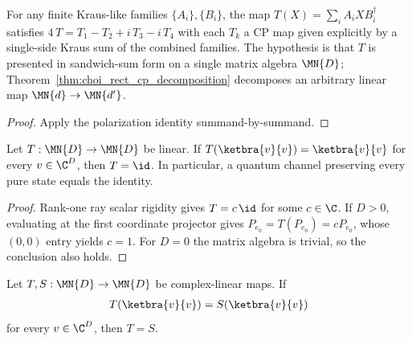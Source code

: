 \begin{theorem}
    \label{thm:cp_decomposition_of_sandwich_sum}
    \leanok
    For any finite Kraus-like families $\{A_i\}, \{B_i\}$, the map
    $T(X) = \sum_i A_i X B_i^\dagger$ satisfies
    $4\,T = T_1 - T_2 + i\,T_3 - i\,T_4$ with each $T_k$ a CP map given
    explicitly by a single-side Kraus sum of the combined families. The
    hypothesis is that $T$ is presented in sandwich-sum form on a single
    matrix algebra $\MN{D}$; Theorem~\ref{thm:choi_rect_cp_decomposition}
    decomposes an arbitrary linear map $\MN{d}\to\MN{d'}$.
\end{theorem}

\begin{proof}
    \leanok
    Apply the polarization identity summand-by-summand.
\end{proof}

\begin{theorem}
    \label{thm:linearMap_eq_id_of_fixes_rankOne}
    \leanok
    Let $T : \MN{D} \to \MN{D}$ be linear. If $T(\ketbra{v}{v})
        = \ketbra{v}{v}$ for every $v \in \C^D$, then
    $T = \id$. In particular, a quantum channel preserving every
    pure state equals the identity.
\end{theorem}

\begin{proof}
    \leanok
    Rank-one ray scalar rigidity gives $T=c\,\id$ for some $c\in\C$.
    If $D>0$, evaluating at the first coordinate projector gives
    $P_{e_0}=T(P_{e_0})=cP_{e_0}$, whose $(0,0)$ entry yields $c=1$.
    For $D=0$ the matrix algebra is trivial, so the conclusion also holds.
\end{proof}

\begin{theorem}
    \label{thm:linearMap_eq_of_eq_on_rankOne}
    \leanok
    Let $T,S:\MN{D}\to\MN{D}$ be complex-linear maps. If
    \begin{align}
        T(\ketbra{v}{v})=S(\ketbra{v}{v})
    \end{align}
    for every $v\in\C^D$, then $T=S$.
\end{theorem}

